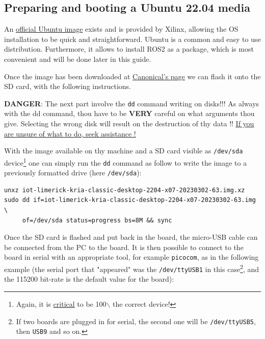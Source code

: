 \documentclass[10pt]{article}
\begin{document}
\subsection{Preparing and booting a Ubuntu 22.04 media}
\label{sec:org527f38f}
An \href{https://ubuntu.com/download/amd-xilinx}{official Ubuntu image} exists and is
provided by Xilinx, allowing the OS installation to be quick and
straightforward.
Ubuntu is a common and easy to use distribution. Furthermore,
it allows to install ROS2 as a package, which is most convenient and will be
done later in this guide.

Once the image has been downloaded at \href{https://ubuntu.com/download/amd-xilinx}{Canonical's page}
we can flash it onto the SD card, with the following instructions.

\begin{tcolorbox}[colback=red!5!white,colframe=red!75!black]
\textbf{DANGER}: The next part involve the \texttt{dd} command writing on disks!!!
As always with the dd command, thou have to be \textbf{VERY} careful on what arguments
thou give. Selecting the wrong disk will result on the destruction of
thy data !!
\uline{If you are unsure of what to do, seek assistance !}
\end{tcolorbox}

With the image available on thy machine and a SD card visible as \texttt{/dev/sda} device\footnote{Again, it is \uline{critical} to be 100$\backslash$%
the correct device!}
one can simply run the \texttt{dd} command as follow to write the image to a previously formatted drive (here \texttt{/dev/sda}):

\begin{verbatim}
unxz iot-limerick-kria-classic-desktop-2204-x07-20230302-63.img.xz
sudo dd if=iot-limerick-kria-classic-desktop-2204-x07-20230302-63.img \
     of=/dev/sda status=progress bs=8M && sync
\end{verbatim}


Once the SD card is flashed and put back in the board, the micro-USB cable can be
connected from the PC to the board. It is then possible to
connect to the board in serial with an appropriate tool, for example \texttt{picocom},
as in the following example (the serial port that "appeared" was the \texttt{/dev/ttyUSB1} in this case\footnote{If two boards are plugged in for serial, the second one will be \texttt{/dev/ttyUSB5}, then \texttt{USB9} and so on.},
and the 115200 bit-rate is the default value for the board):
\end{document}
